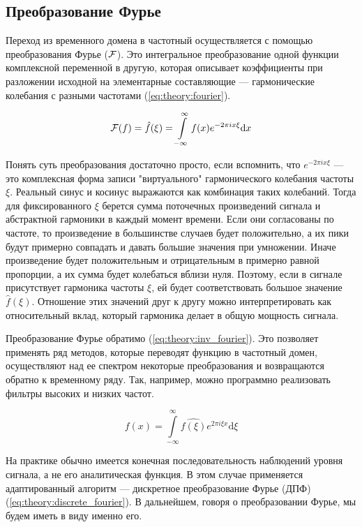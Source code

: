 \subsection{Преобразование Фурье}

Переход из временного домена в частотный осуществляется с помощью преобразования Фурье ($\mathcal{F}$). Это интегральное преобразование одной функции комплексной переменной в другую, которая описывает коэффициенты при разложении исходной на элементарные составляющие --- гармонические колебания с разными частотами (\autoref{eq:theory:fourier}). \cite{dspguide} \cite{fourier_habr} \cite{fourier_wiki}

\begin{equation}
  \label{eq:theory:fourier}
  \mathcal{F}(f) = \hat{f}(\xi) = \int\limits_{-\infty}^{\infty} f(x) e^{-2 \pi i x \xi} \mathrm{d}x
\end{equation}

Понять суть преобразования достаточно просто, если вспомнить, что $e^{-2 \pi i x \xi}$ --- это комплексная форма записи "виртуального" гармонического колебания частоты $\xi$. Реальный синус и косинус выражаются как комбинация таких колебаний. Тогда для фиксированного $\xi$ берется сумма поточечных произведений сигнала и абстрактной гармоники в каждый момент времени. Если они согласованы по частоте, то произведение в большинстве случаев будет положительно, а их пики будут примерно совпадать и давать большие значения при умножении. Иначе произведение будет положительным и отрицательным в примерно равной пропорции, а их сумма будет колебаться вблизи нуля. Поэтому, если в сигнале присутствует гармоника частоты $\xi$, ей будет соответствовать большое значение $\hat{f}(\xi)$. Отношение этих значений друг к другу можно интерпретировать как относительный вклад, который гармоника делает в общую мощность сигнала.

Преобразование Фурье обратимо (\autoref{eq:theory:inv_fourier}). Это позволяет применять ряд методов, которые переводят функцию в частотный домен, осуществляют над ее спектром некоторые преобразования и возвращаются обратно к временному ряду. Так, например, можно программно реализовать фильтры высоких и низких частот.

\begin{equation}
  \label{eq:theory:inv_fourier}
  f(x) = \int\limits_{-\infty}^{\infty} \hat{f(\xi)} e^{2 \pi i \xi x} \mathrm{d}\xi
\end{equation}

На практике обычно имеется конечная последовательность наблюдений уровня сигнала, а не его аналитическая функция. В этом случае применяется адаптированный алгоритм --- дискретное преобразование Фурье (ДПФ) (\autoref{eq:theory:discrete_fourier}). В дальнейшем, говоря о преобразовании Фурье, мы будем иметь в виду именно его.

